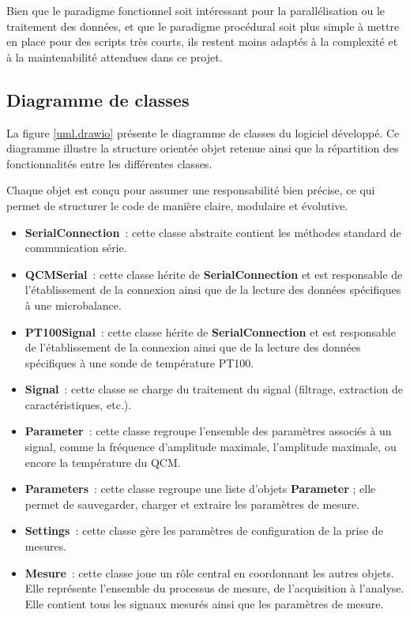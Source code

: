 Bien que le paradigme fonctionnel soit intéressant pour la parallélisation ou le traitement des données, et que le paradigme procédural soit plus simple à mettre en place pour des scripts très courts, ils restent moins adaptés à la complexité et à la maintenabilité attendues dans ce projet.

\subsection{Diagramme de classes}

La figure \ref{uml.drawio} présente le diagramme de classes du logiciel développé. Ce diagramme illustre la structure orientée objet retenue ainsi que la répartition des fonctionnalités entre les différentes classes.

Chaque objet est conçu pour assumer une responsabilité bien précise, ce qui permet de structurer le code de manière claire, modulaire et évolutive.

\begin{itemize}[label=\textbullet]
  \item \textbf{SerialConnection}~: cette classe abstraite contient les méthodes standard de communication série.
  \item \textbf{QCMSerial}~: cette classe hérite de \textbf{SerialConnection} et est responsable de l’établissement de la connexion ainsi que de la lecture des données spécifiques à une microbalance.
  \item \textbf{PT100Signal}~: cette classe hérite de \textbf{SerialConnection} et est responsable de l’établissement de la connexion ainsi que de la lecture des données spécifiques à une sonde de température PT100.
  \item \textbf{Signal}~: cette classe se charge du traitement du signal (filtrage, extraction de caractéristiques, etc.).
  \item \textbf{Parameter}~: cette classe regroupe l’ensemble des paramètres associés à un signal, comme la fréquence d’amplitude maximale, l'amplitude maximale, ou encore la température du QCM.
  \item \textbf{Parameters}~: cette classe regroupe une liste d’objets \textbf{Parameter} ; elle permet de sauvegarder, charger et extraire les paramètres de mesure.
  \item \textbf{Settings}~: cette classe gère les paramètres de configuration de la prise de mesures.
  \item \textbf{Mesure}~: cette classe joue un rôle central en coordonnant les autres objets. Elle représente l’ensemble du processus de mesure, de l’acquisition à l’analyse. Elle contient tous les signaux mesurés ainsi que les paramètres de mesure.
\end{itemize}

